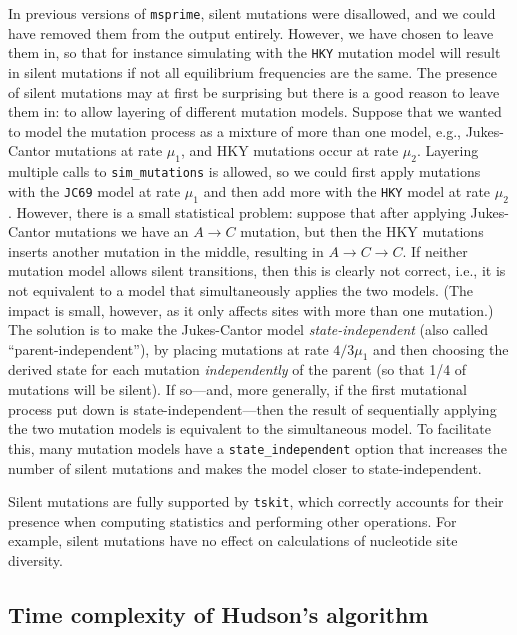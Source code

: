 \documentclass[9pt,twocolumn,twoside,lineno]{gsajnl}
\newcommand{\msprime}[0]{\texttt{msprime}}
\newcommand{\tskit}[0]{\texttt{tskit}}
\begin{document}
In previous versions of \msprime, silent mutations were disallowed,
and we could have removed them from the output entirely.
However, we have chosen to leave them in, so that for instance
simulating with the \texttt{HKY} mutation model will result in silent mutations
if not all equilibrium frequencies are the same.
The presence of silent mutations may at first be surprising
but there is a good reason to leave them in:
to allow layering of different mutation models.
Suppose that we wanted to model the mutation process as a mixture of more than one model,
e.g., Jukes-Cantor mutations at rate $\mu_1$, and
HKY mutations occur at rate $\mu_2$.
Layering multiple calls to \texttt{sim\_mutations} is allowed,
so we could first apply mutations with the \texttt{JC69} model at rate $\mu_1$
and then add more with the \texttt{HKY} model at rate $\mu_2$.
However, there is a small statistical problem:
suppose that after applying Jukes-Cantor mutations we have an $A \to C$ mutation,
but then the HKY mutations inserts another mutation in the middle,
resulting in $A \to C \to C$.
If neither mutation model allows silent transitions,
then this is clearly not correct,
i.e., it is not equivalent to a model that simultaneously applies the two models.
(The impact is small, however, as it only affects sites with more than one mutation.)
The solution is to make the Jukes-Cantor model \emph{state-independent}
(also called ``parent-independent''),
by placing mutations at rate $4/3 \mu_1$ and then choosing the derived state for each mutation
\emph{independently} of the parent (so that 1/4 of mutations will be silent).
If so---and, more generally, if the first mutational process put down is
state-independent---then the result of sequentially applying the two mutation models
is equivalent to the simultaneous model.
To facilitate this, many mutation models have a \texttt{state\_independent} option
that increases the number of silent mutations
and makes the model closer to state-independent.

Silent mutations are fully supported by \tskit, which correctly accounts for
their presence when computing statistics and performing other operations.
For example, silent mutations have no effect on calculations of nucleotide
site diversity.


\subsection*{Time complexity of Hudson's algorithm}
\label{app-time-complexity}
\end{document}
